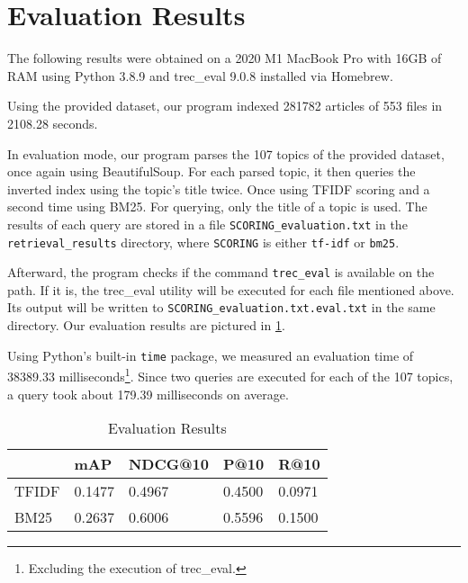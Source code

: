 \section{Evaluation Results}
\label{sec:results}

The following results were obtained on a 2020 M1 MacBook Pro with 16GB of RAM using Python 3.8.9 and trec\_eval 9.0.8 installed via Homebrew.

\medskip

Using the provided dataset, our program indexed 281782 articles of 553 files in 2108.28 seconds.

\medskip

In evaluation mode, our program parses the 107 topics of the provided dataset, once again using BeautifulSoup.
For each parsed topic, it then queries the inverted index using the topic's title twice.
Once using TFIDF scoring and a second time using BM25.
For querying, only the title of a topic is used.
The results of each query are stored in a file \verb|SCORING_evaluation.txt| in the \verb|retrieval_results| directory, where \verb|SCORING| is either \verb|tf-idf| or \verb|bm25|.

Afterward, the program checks if the command \verb|trec_eval| is available on the path.
If it is, the trec\_eval utility will be executed for each file mentioned above.
Its output will be written to \verb|SCORING_evaluation.txt.eval.txt| in the same directory.
Our evaluation results are pictured in \cref{table:results}.

Using Python's built-in \verb|time| package, we measured an evaluation time of 38389.33 milliseconds\footnote{Excluding the execution of trec\_eval.}.
Since two queries are executed for each of the 107 topics, a query took about 179.39 milliseconds on average.

\begin{table}[]
\center
\begin{tabular}{|l|l|l|l|l|}
	\hline
	      & mAP    & NDCG@10 & P@10   & R@10   \\
	\hline
	TFIDF & 0.1477 & 0.4967  & 0.4500 & 0.0971 \\
	\hline
	BM25  & 0.2637 & 0.6006  & 0.5596 & 0.1500 \\
	\hline
\end{tabular}
\caption{Evaluation Results}
\label{table:results}
\end{table}
